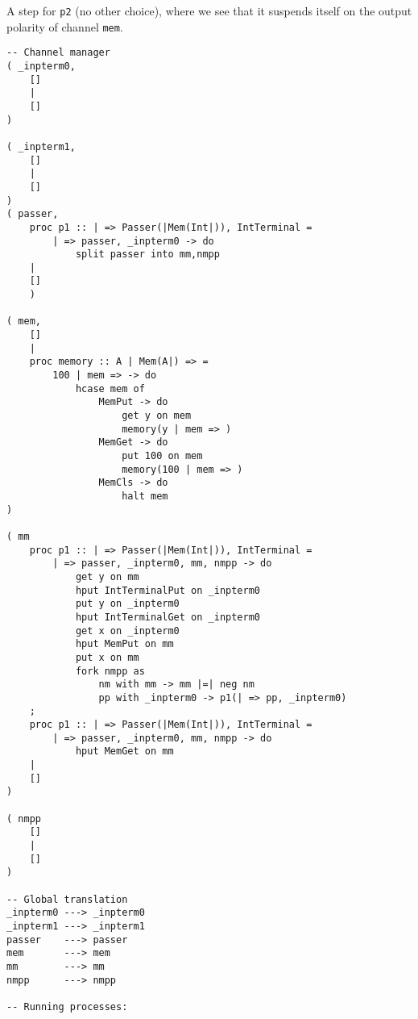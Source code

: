 \documentclass{article}
\theoremstyle{plain}%
\theoremstyle{definition}
\theoremstyle{remark}
\begin{document}
A step for \verb|p2| (no other choice), where we see that it suspends itself on the output polarity of channel \verb|mem|.
\begin{verbatim}
-- Channel manager
( _inpterm0,  
    []
    |
    []
)

( _inpterm1,  
    []
    |
    []
)
( passer,
    proc p1 :: | => Passer(|Mem(Int|)), IntTerminal = 
        | => passer, _inpterm0 -> do
            split passer into mm,nmpp 
    |
    []
    )

( mem,
    []
    |
    proc memory :: A | Mem(A|) => =
        100 | mem => -> do
            hcase mem of
                MemPut -> do
                    get y on mem
                    memory(y | mem => )
                MemGet -> do
                    put 100 on mem
                    memory(100 | mem => )
                MemCls -> do
                    halt mem
)

( mm
    proc p1 :: | => Passer(|Mem(Int|)), IntTerminal = 
        | => passer, _inpterm0, mm, nmpp -> do
            get y on mm
            hput IntTerminalPut on _inpterm0
            put y on _inpterm0
            hput IntTerminalGet on _inpterm0
            get x on _inpterm0
            hput MemPut on mm
            put x on mm
            fork nmpp as
                nm with mm -> mm |=| neg nm 
                pp with _inpterm0 -> p1(| => pp, _inpterm0)
    ;
    proc p1 :: | => Passer(|Mem(Int|)), IntTerminal = 
        | => passer, _inpterm0, mm, nmpp -> do
            hput MemGet on mm 
    |
    []
)

( nmpp
    []
    |
    []
)

-- Global translation
_inpterm0 ---> _inpterm0 
_inpterm1 ---> _inpterm1 
passer    ---> passer 
mem       ---> mem
mm        ---> mm
nmpp      ---> nmpp

-- Running processes:

\end{verbatim}
\end{document}
